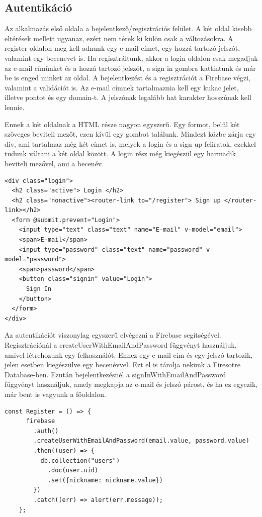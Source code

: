 \subsection{Autentikáció}
Az alkalmazás első oldala a bejelentkező/regisztrációs felület. A két oldal kisebb eltérések mellett ugyanaz, ezért nem térek ki külön csak a változásokra. A register oldalon meg kell adnunk egy e-mail címet, egy hozzá tartozó jelszót, valamint egy becenevet is. Ha regisztráltunk, akkor a login oldalon csak megadjuk az e-mail címünket és a hozzá tartozó jelszót, a sign in gombra kattintunk és már be is enged minket az oldal. A bejelentkezést és a regisztrációt a Firebase végzi, valamint a validációt is. Az e-mail címnek tartalmaznia kell egy kukac jelet, illetve pontot és egy domain-t. A jelszónak legalább hat karakter hosszúnak kell lennie.

Ennek a két oldalnak a HTML része nagyon egyszerű. Egy formot, belül két szöveges beviteli mezőt, ezen kívül egy gombot találunk. Mindezt közbe zárja egy div, ami tartalmaz még két címet is, melyek a login és a sign up feliratok, ezekkel tudunk váltani a két oldal között. A login rész még kiegészül egy harmadik beviteli mezővel, ami a becenév.

\begin{lstlisting}[style=htmlcssjs]
<div class="login">
  <h2 class="active"> Login </h2>
  <h2 class="nonactive"><router-link to="/register"> Sign up </router-link></h2> 
  <form @submit.prevent="Login">
    <input type="text" class="text" name="E-mail" v-model="email">
    <span>E-mail</span>
    <input type="password" class="text" name="password" v-model="password">
    <span>password</span>
    <button class="signin" value="Login">
      Sign In
    </button>
  </form>
</div>
\end{lstlisting}

Az autentikációt viszonylag egyszerű elvégezni a Firebase segítségével. Regisztrációnál a createUserWithEmailAndPassword függvényt használjuk, amivel létrehozunk egy felhasználót. Ehhez egy e-mail cím és egy jelszó tartozik, jelen esetben kiegészülve egy becenévvel. Ezt el is tárolja nekünk a Firesotre Database-ben. Ezután bejelentkezésnél a signInWithEmailAndPassword függvényt használjuk, amely megkapja az e-mail és jelszó párost, és ha ez egyezik, már bent is vagyunk a főoldalon.

\begin{lstlisting}[style=htmlcssjs]
const Register = () => {
      firebase
        .auth()
        .createUserWithEmailAndPassword(email.value, password.value)
        .then((user) => {
          db.collection("users")
            .doc(user.uid)
            .set({nickname: nickname.value})
        })
        .catch((err) => alert(err.message));
    };
\end{lstlisting}

